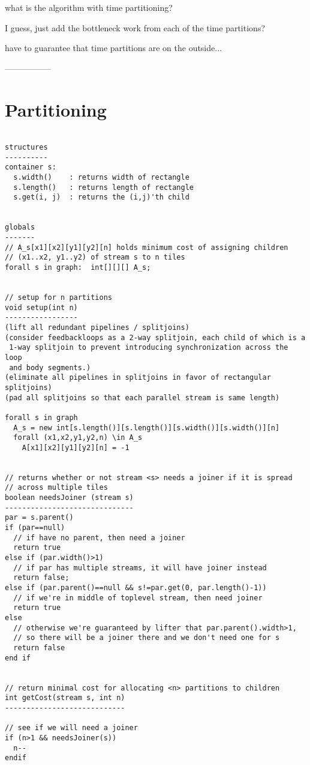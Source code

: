 what is the algorithm with time partitioning?

I guess, just add the bottleneck work from each of the time
partitions?

have to guarantee that time partitions are on the outside...

-----------------

\section{Partitioning}

\scriptsize
\begin{verbatim}

structures
----------
container s:
  s.width()    : returns width of rectangle
  s.length()   : returns length of rectangle
  s.get(i, j)  : returns the (i,j)'th child


globals
-------
// A_s[x1][x2][y1][y2][n] holds minimum cost of assigning children 
// (x1..x2, y1..y2) of stream s to n tiles
forall s in graph:  int[][][] A_s;


// setup for n partitions
void setup(int n) 
-----------------
(lift all redundant pipelines / splitjoins)
(consider feedbackloops as a 2-way splitjoin, each child of which is a
 1-way splitjoin to prevent introducing synchronization across the loop
 and body segments.)
(eliminate all pipelines in splitjoins in favor of rectangular splitjoins)
(pad all splitjoins so that each parallel stream is same length)

forall s in graph
  A_s = new int[s.length()][s.length()][s.width()][s.width()][n]
  forall (x1,x2,y1,y2,n) \in A_s
    A[x1][x2][y1][y2][n] = -1


// returns whether or not stream <s> needs a joiner if it is spread
// across multiple tiles
boolean needsJoiner (stream s)
------------------------------
par = s.parent()
if (par==null)
  // if have no parent, then need a joiner
  return true
else if (par.width()>1)
  // if par has multiple streams, it will have joiner instead
  return false;
else if (par.parent()==null && s!=par.get(0, par.length()-1))
  // if we're in middle of toplevel stream, then need joiner
  return true
else
  // otherwise we're guaranteed by lifter that par.parent().width>1,
  // so there will be a joiner there and we don't need one for s
  return false
end if


// return minimal cost for allocating <n> partitions to children
int getCost(stream s, int n)
----------------------------

// see if we will need a joiner
if (n>1 && needsJoiner(s)) 
  n--
endif


\end{verbatim}
